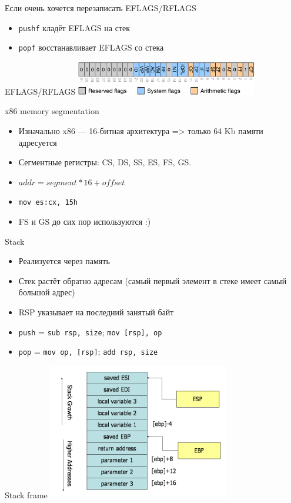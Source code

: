 \documentclass[10pt,pdf,hyperref={unicode}]{beamer}
\newcommand{\asm}[1]{\texttt{#1}}
\begin{document}
\begin{frame}{Если очень хочется перезаписать EFLAGS/RFLAGS}
\begin{itemize}
    \item \asm{pushf} кладёт EFLAGS на стек
    \item \asm{popf} восстанавливает EFLAGS со стека
\end{itemize}
\end{frame}

\begin{frame}{EFLAGS/RFLAGS}
\includegraphics[width=300px]{eflags.png}
\end{frame}

\begin{frame}{x86 memory segmentation}
\begin{itemize}
    \item Изначально x86 — 16-битная архитектура => только 64 Kb памяти адресуется
    \item Сегментные регистры: CS, DS, SS, ES, FS, GS.
    \item $addr = segment * 16 + offset$
    \item \asm{mov es:cx, 15h}
    \item FS и GS до сих пор используются :)
\end{itemize}
\end{frame}

\begin{frame}{Stack}
\begin{itemize}
    \item Реализуется через память
    \item Стек растёт обратно адресам (самый первый элемент в стеке имеет самый большой адрес)
    \item RSP указывает на последний занятый байт
    \item \asm{push} = \asm{sub rsp, size}; \asm{mov [rsp], op}
    \item \asm{pop} = \asm{mov op, [rsp]}; \asm{add rsp, size}
\end{itemize}
\end{frame}

\begin{frame}{Stack frame}
\includegraphics[width=300px]{stack.png}
\end{frame}
\end{document}
